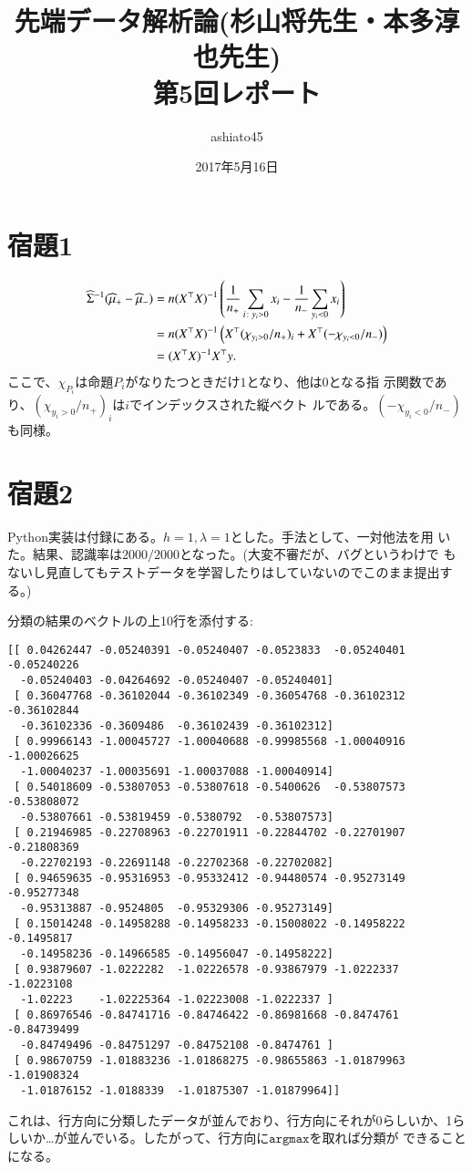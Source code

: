 \documentclass[9pt]{ltjsarticle}
\title{先端データ解析論(杉山将先生・本多淳也先生)\\第5回レポート}
\author{ashiato45}
\date{2017年5月16日}
\begin{document}
\maketitle

\section*{宿題1}
\begin{align}
 {\widehat\Sigma}^{-1}(\widehat \mu_+ - \widehat \mu_-)
&=
n(X^\top X)^{-1} \left(\frac{1}{n_+}\sum_{i\colon y_i > 0} x_i - \frac{1}{n_-}\sum_{y_i<0}x_i\right)\\
 & =
n(X^\top X)^{-1} \left(X^\top (\chi_{y_i > 0}/n_+)_i + X^\top(-\chi_{y_i < 0}/n_-)\right)\\
 & =
(X^\top X)^{-1} X^\top y.
\end{align}
ここで、$\chi_{P_i}$は命題$P_i$がなりたつときだけ$1$となり、他は$0$となる指
示関数であり、$(\chi_{y_i > 0}/n_+)_i$は$i$でインデックスされた縦ベクト
ルである。$(-\chi_{y_i < 0}/n_-)$も同様。

\section*{宿題2}
Python実装は付録にある。$h=1, \lambda=1$とした。手法として、一対他法を用
いた。結果、認識率は$2000/2000$となった。(大変不審だが、バグというわけで
もないし見直してもテストデータを学習したりはしていないのでこのまま提出す
る。)

分類の結果のベクトルの上10行を添付する:
\begin{verbatim}
[[ 0.04262447 -0.05240391 -0.05240407 -0.0523833  -0.05240401 -0.05240226
  -0.05240403 -0.04264692 -0.05240407 -0.05240401]
 [ 0.36047768 -0.36102044 -0.36102349 -0.36054768 -0.36102312 -0.36102844
  -0.36102336 -0.3609486  -0.36102439 -0.36102312]
 [ 0.99966143 -1.00045727 -1.00040688 -0.99985568 -1.00040916 -1.00026625
  -1.00040237 -1.00035691 -1.00037088 -1.00040914]
 [ 0.54018609 -0.53807053 -0.53807618 -0.5400626  -0.53807573 -0.53808072
  -0.53807661 -0.53819459 -0.5380792  -0.53807573]
 [ 0.21946985 -0.22708963 -0.22701911 -0.22844702 -0.22701907 -0.21808369
  -0.22702193 -0.22691148 -0.22702368 -0.22702082]
 [ 0.94659635 -0.95316953 -0.95332412 -0.94480574 -0.95273149 -0.95277348
  -0.95313887 -0.9524805  -0.95329306 -0.95273149]
 [ 0.15014248 -0.14958288 -0.14958233 -0.15008022 -0.14958222 -0.1495817
  -0.14958236 -0.14966585 -0.14956047 -0.14958222]
 [ 0.93879607 -1.0222282  -1.02226578 -0.93867979 -1.0222337  -1.0223108
  -1.02223    -1.02225364 -1.02223008 -1.0222337 ]
 [ 0.86976546 -0.84741716 -0.84746422 -0.86981668 -0.8474761  -0.84739499
  -0.84749496 -0.84751297 -0.84752108 -0.8474761 ]
 [ 0.98670759 -1.01883236 -1.01868275 -0.98655863 -1.01879963 -1.01908324
  -1.01876152 -1.0188339  -1.01875307 -1.01879964]]	
\end{verbatim}
これは、行方向に分類したデータが並んでおり、行方向にそれが0らしいか、1ら
しいか…が並んでいる。したがって、行方向に$\mathtt{argmax}$を取れば分類が
できることになる。
\end{document}
